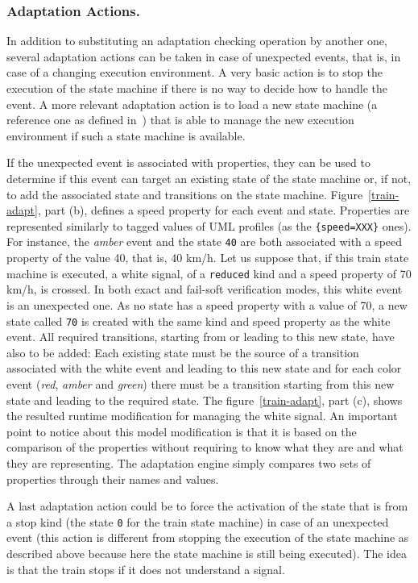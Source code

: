 \documentclass[english, 10pt]{llncs}
\begin{document}
\subsubsection{Adaptation Actions.}

In addition to substituting an adaptation checking operation by
another one, several adaptation actions can be taken in case of
unexpected events, that is, in case of a changing execution
environment. A very basic action is to stop the execution of the state
machine if there is no way to decide how to handle the event. A more
relevant adaptation action is to load a new state machine (a reference
one as defined in~\cite{cariou-mrt12}) that is able to manage the new
execution environment if such a state machine is available.

If the unexpected event is associated with properties, they can be
used to determine if this event can target an existing state of the
state machine or, if not, to add the associated state and transitions
on the state machine. Figure~\ref{train-adapt}, part (b), defines a
speed property for each event and state. Properties are represented
similarly to tagged values of UML profiles (as the
\texttt{\{speed=XXX\}} ones). For instance, the \textit{amber} event
and the state \texttt{40} are both associated with a speed property of
the value 40, that is, 40 km/h. Let us suppose that, if this train
state machine is executed, a white signal, of a \texttt{reduced} kind and a
speed property of 70 km/h, is crossed. In both exact and fail-soft
verification modes, this white event is an unexpected one. As no state
has a speed property with a value of 70, a new state called
\texttt{70} is created with the same kind and speed property as the
white event. All required transitions, starting from or leading to
this new state, have also to be added: Each existing state must be the
source of a transition associated with the white event and leading to
this new state and for each color event (\textit{red}, \textit{amber} and
\textit{green}) there must be a transition starting from this new
state and leading to the required state. The figure~\ref{train-adapt},
part (c), shows the resulted runtime modification for managing the
white signal. An important point to notice about this model
modification is that it is based on the comparison of the properties
without requiring to know what they are and what they are
representing. The adaptation engine simply compares two sets of
properties through their names and values.

A last adaptation action could be to force the activation of the state
that is from a stop kind (the state \texttt{0} for the train state
machine) in case of an unexpected event (this action is different from
stopping the execution of the state machine as described above because
here the state machine is still being executed). The idea is that the
train stops if it does not understand a signal.
\end{document}
